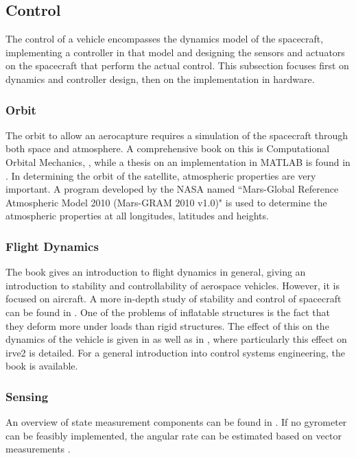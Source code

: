 \subsection{Control} \label{sec:control}
The control of a vehicle encompasses the dynamics model of the spacecraft, implementing a controller in that model and designing the sensors and actuators on the spacecraft that perform the actual control. This subsection focuses first on dynamics and controller design, then on the implementation in hardware.

\subsubsection{Orbit}
The orbit to allow an aerocapture requires a simulation of the spacecraft through both space and atmosphere. A comprehensive book on this is Computational Orbital Mechanics, \cite{Weiland2004}, while a thesis on an implementation in MATLAB is found in \cite{Leszczynski1998}. In determining the orbit of the satellite, atmospheric properties are very important. A program developed by the NASA named ``Mars-Global Reference Atmospheric Model 2010 (Mars-GRAM 2010 v1.0)" is used to determine the atmospheric properties at all longitudes, latitudes and heights. \cite{Justus2001}

\subsubsection{Flight Dynamics}
The book \cite{Mulder2013} gives an introduction to flight dynamics in general, giving an introduction to stability and controllability of aerospace vehicles. However, it is focused on aircraft. A more in-depth study of stability and control of spacecraft can be found in \cite{Steketee1967, Ito2002}. One of the problems of inflatable structures is the fact that they deform more under loads than rigid structures. The effect of this on the dynamics of the vehicle is given in \cite{Axdahl2009} as well as in \cite{Bose2009}, where particularly this effect on \gls{irve2} is detailed. For a general introduction into control systems engineering, the book \cite{Nise2011} is available.

\subsubsection{Sensing}
An overview of state measurement components can be found in \cite{Wertz2011a}. If no gyrometer can be feasibly implemented, the angular rate can be estimated based on vector measurements \cite{Azor1998}.

